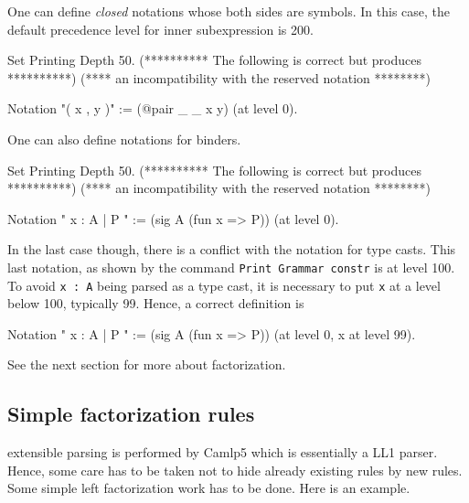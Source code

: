 One can define {\em closed} notations whose both sides are symbols. In
this case, the default precedence level for inner subexpression is 200.

\begin{coq_eval}
Set Printing Depth 50.
(********** The following is correct but produces **********)
(**** an incompatibility with the reserved notation ********)
\end{coq_eval}
\begin{coq_example*}
Notation "( x , y )" := (@pair _ _ x y) (at level 0).
\end{coq_example*}

One can also define notations for binders.

\begin{coq_eval}
Set Printing Depth 50.
(********** The following is correct but produces **********)
(**** an incompatibility with the reserved notation ********)
\end{coq_eval}
\begin{coq_example*}
Notation "{ x : A  |  P }" := (sig A (fun x => P)) (at level 0).
\end{coq_example*}

In the last case though, there is a conflict with the notation for
type casts. This last notation, as shown by the command {\tt Print Grammar
constr} is at level 100. To avoid \verb=x : A= being parsed as a type cast,
it is necessary to put {\tt x} at a level below 100, typically 99. Hence, a
correct definition is 

\begin{coq_example*}
Notation "{ x : A  |  P }" := (sig A (fun x => P)) (at level 0, x at level 99).
\end{coq_example*}

%

See the next section for more about factorization.

\subsection{Simple factorization rules}

{\Coq} extensible parsing is performed by Camlp5 which is essentially a
LL1 parser. Hence, some care has to be taken not to hide already
existing rules by new rules. Some simple left factorization work has
to be done. Here is an example.

